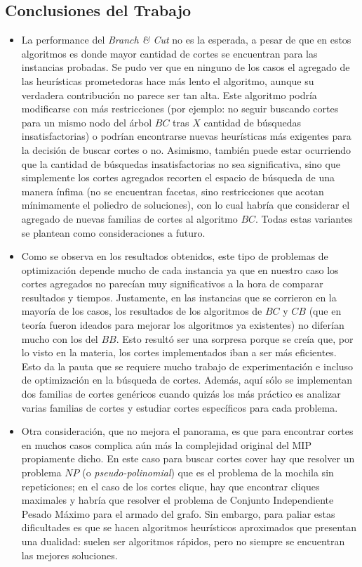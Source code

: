 \subsection{Conclusiones del Trabajo}

\begin{itemize}

\item La performance del \emph{Branch \& Cut} no es la esperada, a pesar de que en estos algoritmos es donde mayor cantidad de cortes se encuentran para las instancias probadas. Se pudo ver que en ninguno de los casos el agregado de las heurísticas prometedoras hace más lento el algoritmo, aunque su verdadera contribución no parece ser tan alta. Este algoritmo podría modificarse con más restricciones (por ejemplo: no seguir buscando cortes para un mismo nodo del árbol $BC$ tras $X$ cantidad de búsquedas insatisfactorias) o podrían encontrarse nuevas heurísticas más exigentes para la decisión de buscar cortes o no. Asimismo, también puede estar ocurriendo que la cantidad de búsquedas insatisfactorias no sea significativa, sino que simplemente los cortes agregados recorten el espacio de búsqueda de una manera ínfima (no se encuentran facetas, sino restricciones que acotan mínimamente el poliedro de soluciones), con lo cual habría que considerar el agregado de nuevas familias de cortes al algoritmo $BC$. Todas estas variantes se plantean como consideraciones a futuro.

\item Como se observa en los resultados obtenidos, este tipo de problemas de optimización depende mucho de cada instancia ya que en nuestro caso los cortes agregados no parecían muy significativos a la hora de comparar resultados y tiempos. Justamente, en las instancias que se corrieron en la mayoría de los casos, los resultados de los algoritmos de $BC$ y $CB$ (que en teoría fueron ideados para mejorar los algoritmos ya existentes) no diferían mucho con los del $BB$. Esto resultó ser una sorpresa porque se creía que, por lo visto en la materia, los cortes implementados iban a ser más eficientes. Esto da la pauta que se requiere mucho trabajo de experimentación e incluso de optimización en la búsqueda de cortes. Además, aquí sólo se implementan dos familias de cortes genéricos cuando quizás los más práctico es analizar varias familias de cortes y estudiar cortes específicos para cada problema.

\item Otra consideración, que no mejora el panorama, es que para encontrar cortes en muchos casos complica aún más la complejidad original del MIP propiamente dicho. En este caso para buscar cortes cover hay que resolver un problema $NP$ (o \emph{pseudo-polinomial}) que es el problema de la mochila sin repeticiones; en el caso de los cortes clique, hay que encontrar cliques maximales y habría que resolver el problema de Conjunto Independiente Pesado Máximo para el armado del grafo. Sin embargo, para paliar estas dificultades es que se hacen algoritmos heurísticos aproximados que presentan una dualidad: suelen ser algoritmos rápidos, pero no siempre se encuentran las mejores soluciones.


\end{itemize}
